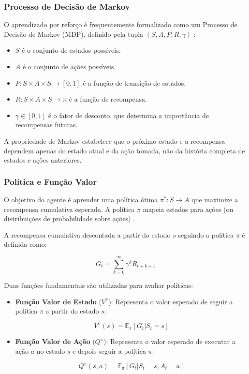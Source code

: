 \subsubsection{Processo de Decisão de Markov}

O aprendizado por reforço é frequentemente formalizado como um Processo de Decisão de Markov (MDP), definido pela tupla $(S, A, P, R, \gamma)$ \cite{Puterman2014}:

\begin{itemize}
    \item $S$ é o conjunto de estados possíveis.
    \item $A$ é o conjunto de ações possíveis.
    \item $P: S \times A \times S \rightarrow [0, 1]$ é a função de transição de estados.
    \item $R: S \times A \times S \rightarrow \mathbb{R}$ é a função de recompensa.
    \item $\gamma \in [0, 1]$ é o fator de desconto, que determina a importância de recompensas futuras.
\end{itemize}

A propriedade de Markov estabelece que o próximo estado e a recompensa dependem apenas do estado atual e da ação tomada, não da história completa de estados e ações anteriores.

\subsubsection{Política e Função Valor}

O objetivo do agente é aprender uma política ótima $\pi^*: S \rightarrow A$ que maximize a recompensa cumulativa esperada. A política $\pi$ mapeia estados para ações (ou distribuições de probabilidade sobre ações) \cite{Sutton2018}.

A recompensa cumulativa descontada a partir do estado $s$ seguindo a política $\pi$ é definida como:

\begin{equation}
G_t = \sum_{k=0}^{\infty} \gamma^k R_{t+k+1}
\end{equation}

Duas funções fundamentais são utilizadas para avaliar políticas:

\begin{itemize}
    \item \textbf{Função Valor de Estado} ($V^{\pi}$): Representa o valor esperado de seguir a política $\pi$ a partir do estado $s$:
    
    \begin{equation}
    V^{\pi}(s) = \mathbb{E}_{\pi}[G_t | S_t = s]
    \end{equation}
    
    \item \textbf{Função Valor de Ação} ($Q^{\pi}$): Representa o valor esperado de executar a ação $a$ no estado $s$ e depois seguir a política $\pi$:
    
    \begin{equation}
    Q^{\pi}(s, a) = \mathbb{E}_{\pi}[G_t | S_t = s, A_t = a]
    \end{equation}
\end{itemize}

